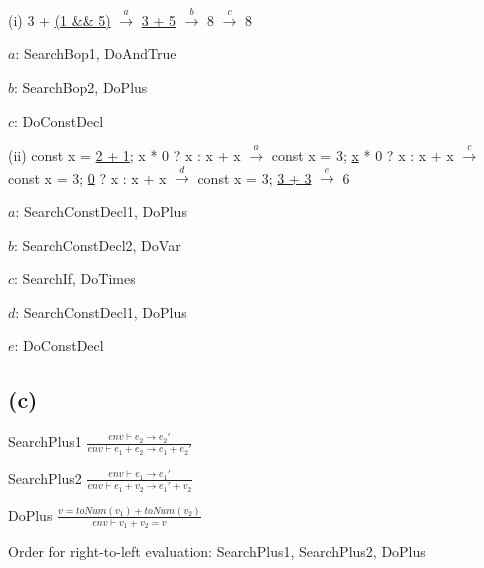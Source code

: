 \documentclass[11pt, oneside]{article}
\let\emptyset\varnothing
\newcommand{\forceindent}{\leavevmode{\parindent=1.5em\indent}}
\begin{document}
\forceindent \par (i) 3 + \underline{(1 \&\& 5)} $\xrightarrow{a}$ \underline{3 + 5} $\xrightarrow{b}$ 8 $\xrightarrow{c}$ 8
\par $a$: SearchBop1, DoAndTrue
\par $b$: SearchBop2, DoPlus
\par $c$: DoConstDecl

\vspace{1.5\baselineskip}



\par (ii) const x = \underline{2 + 1}; x * 0 ? x : x + x $\xrightarrow{a}$ const x = 3; \underline{x} * 0 ? x : x + x $\xrightarrow{c}$ const x = 3; \underline{0} ? x : x + x $\xrightarrow{d}$ const x = 3; \underline{3 + 3} $\xrightarrow{e}$ 6
\par $a$: SearchConstDecl1, DoPlus
\par $b$: SearchConstDecl2, DoVar
\par $c$: SearchIf, DoTimes
\par $d$: SearchConstDecl1, DoPlus
\par $e$: DoConstDecl

\subsection*{(c)}
\forceindent \par 
\par SearchPlus1
$
\frac{
	env \vdash e_2 \rightarrow e_2'
}
{
	env \vdash e_1 + e_2 \rightarrow e_1 + e_2'
}
$
\par SearchPlus2
$
\frac{
	env \vdash e_1 \rightarrow e_1'
}
{
	env \vdash e_1 + v_2 \rightarrow e_1' + v_2
}
$
\par DoPlus
$
\frac{
	v = toNum(v_1) + toNum(v_2)
}
{
	env \vdash v_1 + v_2 = v
}
$
\par Order for right-to-left evaluation: SearchPlus1, SearchPlus2, DoPlus
\end{document}
